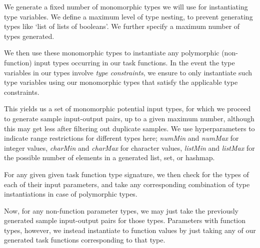\documentclass{article}
\begin{document}
We generate a fixed number of monomorphic types we will use for instantiating type variables.
We define a
maximum level of type nesting,
to prevent generating types like `list of lists of booleans'.
We further specify a maximum number of types generated.

We then use these monomorphic types to instantiate any polymorphic
(non-function) input types occurring in our task functions.
In the event the type variables in our types involve \emph{type constraints},
we ensure to only instantiate such type variables using our monomorphic types that satisfy the applicable type constraints.

This yields us a set of monomorphic potential input types,
for which we proceed to generate sample input-output pairs,
up to a given maximum number,
although this may get less after filtering out duplicate samples.
We use hyperparameters to indicate range restrictions for different types here;
\emph{numMin} and \emph{numMax} for integer values,
\emph{charMin} and \emph{charMax} for character values,
\emph{listMin} and \emph{listMax} for the possible number of elements in a generated list, set, or hashmap.

For any given given task function type signature,
we then check for the types of each of their input parameters,
and take any corresponding combination of type instantiations in case of polymorphic types.

Now, for any non-function parameter types,
we may just take the previously generated sample input-output pairs for those types.
Parameters with function types, however,
we instead instantiate to function values by just taking
any of our generated task functions corresponding to that type.
\end{document}
